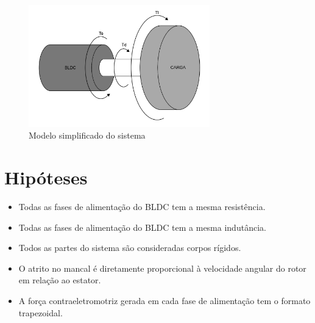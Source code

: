         \begin{figure}[ht]
            \centering
            \includegraphics[width=0.7\textwidth]{sketch_bldc}
            \caption{Modelo simplificado do sistema}
            \label{fig_modelo_simplificado}
        \end{figure}

    \section{Hipóteses}
        \begin{itemize}
            \item Todas as fases de alimentação do BLDC tem a mesma resistência.
            \item Todas as fases de alimentação do BLDC tem a mesma indutância.
            \item Todos as partes do sistema são consideradas corpos rígidos.
            \item O atrito no mancal é diretamente proporcional à velocidade angular do rotor em relação ao estator.
            \item A força contraeletromotriz gerada em cada fase de alimentação tem o formato trapezoidal.
        \end{itemize}

